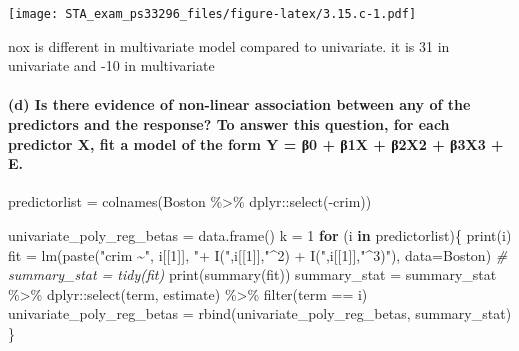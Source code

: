 \documentclass[
]{article}
\newenvironment{Shaded}{\begin{snugshade}}{\end{snugshade}}
\newcommand{\AttributeTok}[1]{\textcolor[rgb]{0.77,0.63,0.00}{#1}}
\newcommand{\CommentTok}[1]{\textcolor[rgb]{0.56,0.35,0.01}{\textit{#1}}}
\newcommand{\ControlFlowTok}[1]{\textcolor[rgb]{0.13,0.29,0.53}{\textbf{#1}}}
\newcommand{\DecValTok}[1]{\textcolor[rgb]{0.00,0.00,0.81}{#1}}
\newcommand{\FunctionTok}[1]{\textcolor[rgb]{0.00,0.00,0.00}{#1}}
\newcommand{\NormalTok}[1]{#1}
\newcommand{\OtherTok}[1]{\textcolor[rgb]{0.56,0.35,0.01}{#1}}
\newcommand{\SpecialCharTok}[1]{\textcolor[rgb]{0.00,0.00,0.00}{#1}}
\newcommand{\StringTok}[1]{\textcolor[rgb]{0.31,0.60,0.02}{#1}}
\begin{document}
\texttt{[image: STA\_exam\_ps33296\_files/figure-latex/3.15.c-1.pdf]}

nox is different in multivariate model compared to univariate. it is 31
in univariate and -10 in multivariate

\hypertarget{d-is-there-evidence-of-non-linear-association-between-any-of-the-predictors-and-the-response-to-answer-this-question-for-each-predictor-x-fit-a-model-of-the-form-y-ux3b20-ux3b21x-ux3b22x2-ux3b23x3-e.}{%
\paragraph{(d) Is there evidence of non-linear association between any
of the predictors and the response? To answer this question, for each
predictor X, fit a model of the form Y = β0 + β1X + β2X2 + β3X3 +
E.}\label{d-is-there-evidence-of-non-linear-association-between-any-of-the-predictors-and-the-response-to-answer-this-question-for-each-predictor-x-fit-a-model-of-the-form-y-ux3b20-ux3b21x-ux3b22x2-ux3b23x3-e.}}

\begin{Shaded}
\begin{Highlighting}[]
\NormalTok{predictorlist }\OtherTok{=} \FunctionTok{colnames}\NormalTok{(Boston }\SpecialCharTok{\%\textgreater{}\%}\NormalTok{ dplyr}\SpecialCharTok{::}\FunctionTok{select}\NormalTok{(}\SpecialCharTok{{-}}\NormalTok{crim))}

\NormalTok{univariate\_poly\_reg\_betas }\OtherTok{=} \FunctionTok{data.frame}\NormalTok{()}
\NormalTok{k }\OtherTok{=} \DecValTok{1}
\ControlFlowTok{for}\NormalTok{ (i }\ControlFlowTok{in}\NormalTok{ predictorlist)\{ }
  \FunctionTok{print}\NormalTok{(i)}
\NormalTok{  fit }\OtherTok{=} \FunctionTok{lm}\NormalTok{(}\FunctionTok{paste}\NormalTok{(}\StringTok{"crim \textasciitilde{}"}\NormalTok{, i[[}\DecValTok{1}\NormalTok{]], }\StringTok{"+ I("}\NormalTok{,i[[}\DecValTok{1}\NormalTok{]],}\StringTok{"\^{}2) + I("}\NormalTok{,i[[}\DecValTok{1}\NormalTok{]],}\StringTok{"\^{}3)"}\NormalTok{), }\AttributeTok{data=}\NormalTok{Boston) }
  \CommentTok{\# summary\_stat = tidy(fit)}
  \FunctionTok{print}\NormalTok{(}\FunctionTok{summary}\NormalTok{(fit))}
\NormalTok{  summary\_stat }\OtherTok{=}\NormalTok{ summary\_stat }\SpecialCharTok{\%\textgreater{}\%}\NormalTok{ dplyr}\SpecialCharTok{::}\FunctionTok{select}\NormalTok{(term, estimate) }\SpecialCharTok{\%\textgreater{}\%} \FunctionTok{filter}\NormalTok{(term }\SpecialCharTok{==}\NormalTok{ i)}
\NormalTok{  univariate\_poly\_reg\_betas }\OtherTok{=} \FunctionTok{rbind}\NormalTok{(univariate\_poly\_reg\_betas, summary\_stat)}
\NormalTok{\} }
\end{Highlighting}
\end{Shaded}
\end{document}
